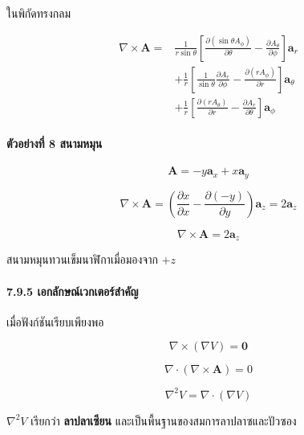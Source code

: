 ในพิกัดทรงกลม

\[
\begin{aligned}
\nabla\times\mathbf{A}
={}&\frac{1}{r\sin\theta}
\left[\frac{\partial(\sin\theta A_\phi)}{\partial\theta}
-\frac{\partial A_\theta}{\partial\phi}\right]\mathbf{a}_r\\
&+\frac{1}{r}
\left[\frac{1}{\sin\theta}\frac{\partial A_r}{\partial\phi}
-\frac{\partial(rA_\phi)}{\partial r}\right]\mathbf{a}_\theta\\
&+\frac{1}{r}
\left[\frac{\partial(rA_\theta)}{\partial r}
-\frac{\partial A_r}{\partial\theta}\right]\mathbf{a}_\phi
\end{aligned}
\]

\paragraph{ตัวอย่างที่ 8 สนามหมุน}

\[
\mathbf{A}=-y\mathbf{a}_x+x\mathbf{a}_y
\]

\[
\nabla\times\mathbf{A}
=\left(\frac{\partial x}{\partial x}
-\frac{\partial(-y)}{\partial y}\right)\mathbf{a}_z
=2\mathbf{a}_z
\]

\[
\boxed{\nabla\times\mathbf{A}=2\mathbf{a}_z}
\]

สนามหมุนทวนเข็มนาฬิกาเมื่อมองจาก \(+z\)

\paragraph{7.9.5 เอกลักษณ์เวกเตอร์สำคัญ}

เมื่อฟังก์ชันเรียบเพียงพอ

\[
\nabla\times(\nabla V)=\mathbf{0}
\]

\[
\nabla\cdot(\nabla\times\mathbf{A})=0
\]

\[
\nabla^2V=\nabla\cdot(\nabla V)
\]

\(\nabla^2V\) เรียกว่า \textbf{ลาปลาเซียน} และเป็นพื้นฐานของสมการลาปลาซและปัวซอง



